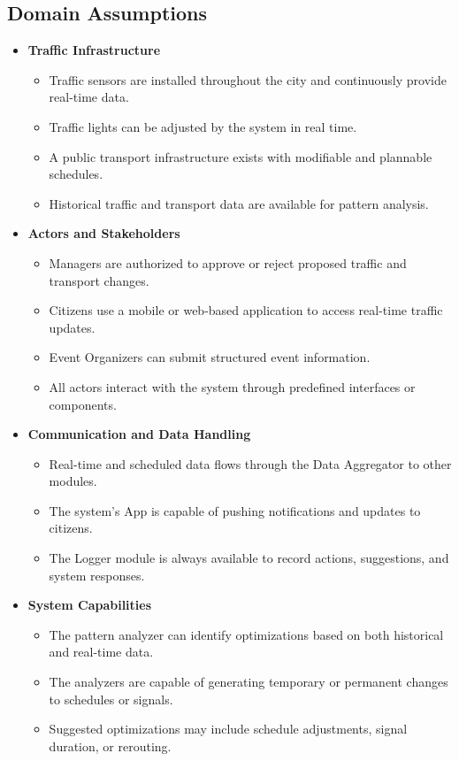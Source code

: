\subsection{Domain Assumptions}
\begin{itemize}

  \item \textbf{Traffic Infrastructure}
  \begin{itemize}
    \item Traffic sensors are installed throughout the city and continuously provide real-time data.
    \item Traffic lights can be adjusted by the system in real time.
    \item A public transport infrastructure exists with modifiable and plannable schedules.
    \item Historical traffic and transport data are available for pattern analysis.
  \end{itemize}

  \item \textbf{Actors and Stakeholders}
  \begin{itemize}
    \item Managers are authorized to approve or reject proposed traffic and transport changes.
    \item Citizens use a mobile or web-based application to access real-time traffic updates.
    \item Event Organizers can submit structured event information.
    \item All actors interact with the system through predefined interfaces or components.
  \end{itemize}

  \item \textbf{Communication and Data Handling}
  \begin{itemize}
    \item Real-time and scheduled data flows through the Data Aggregator to other modules.
    \item The system’s App is capable of pushing notifications and updates to citizens.
    \item The Logger module is always available to record actions, suggestions, and system responses.

  \end{itemize}

  \item \textbf{System Capabilities}
  \begin{itemize}
    \item The pattern analyzer can identify optimizations based on both historical and real-time data.
    \item The analyzers are capable of generating temporary or permanent changes to schedules or signals.
    \item Suggested optimizations may include schedule adjustments, signal duration, or rerouting.
  \end{itemize}
\end{itemize}



